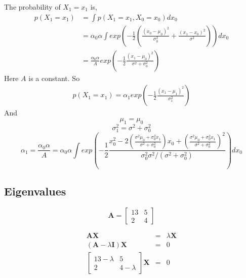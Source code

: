 \documentclass[english,11pt]{article}
\begin{document}
The probability of $X_{1} = x_{1}$ is,
\begin{align*}
p\left ( X_{1}=x_{1} \right )&=\int p\left ( X_{1}=x_{1},X_{0}=x_{0} \right )dx_{0}
\\ &=\alpha _{0}\alpha \int exp\left ( -\frac{1}{2}\left ( \frac{\left ( x_{0}-\mu _{0} \right )^{2}}{\sigma ^{2}_{0}}+ \frac{\left ( x_{1}-x_{0} \right )^{2}}{\sigma^{2} }\right ) \right )dx_{0}
\\ &=\frac{\alpha _{0}\alpha }{A}exp\left ( -\frac{1}{2}\frac{\left ( x_{1}-\mu _{0} \right )^{2}}{\sigma^{2}+\sigma _{0}^{2}} \right )
\end{align*}
Here $A$ is a constant. So 
\begin{align*}
p\left ( X_{1}=x_{1} \right )=\alpha _{1}exp\left ( -\frac{1}{2}\frac{\left ( x_{1}-\mu _{1} \right )^{2}}{\sigma _{1}^{2}} \right )
\end{align*}
And
\begin{equation*}
\mu _{1}=\mu _{0}
\end{equation*}
\begin{equation*}
\sigma _{1}^{2}=\sigma^{2}+\sigma _{0}^{2}
\end{equation*}
\begin{equation*}
\alpha _{1}=\frac{\alpha _{0}\alpha }{A}=\alpha _{0}\alpha\int exp\left (-\frac{1}{2} \frac{x_{0}^{2}-2\left ( \frac{\sigma ^{2}\mu _{0}+\sigma _{0}^{2}x_{1}}{\sigma ^{2}+\sigma _{0}^{2}} \right )x_{0}+\left ( \frac{\sigma ^{2}\mu _{0}+\sigma _{0}^{2}x_{1}}{\sigma ^{2}+\sigma _{0}^{2}} \right )^{2}}{\sigma _{0}^{2}\sigma^{2} /\left ( \sigma ^{2}+\sigma _{0}^{2} \right )} \right )dx_{0}
\end{equation*}

\subsection{Eigenvalues}

\[
\boldsymbol{A}=\left[\begin{array}{cc}
13 & 5\\
2 & 4
\end{array}\right]
\]

\begin{eqnarray*}
\boldsymbol{A}\boldsymbol{X} & = & \lambda\boldsymbol{X}\\
(\boldsymbol{A}-\lambda\boldsymbol{I})\boldsymbol{X} & = & 0\\
\left[\begin{array}{cc}
13-\lambda & 5\\
2 & 4-\lambda
\end{array}\right]\boldsymbol{X} & = & 0
\end{eqnarray*}
\end{document}
